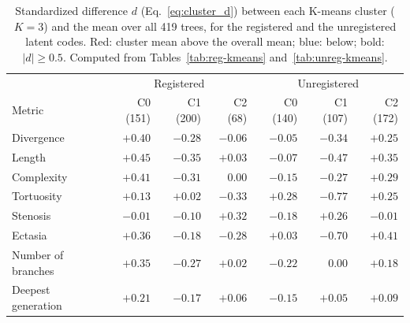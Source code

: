\begin{table}[htbp]                      %
  \centering
  \clustertablesetup
  \small
  \caption{Standardized difference $d$ (Eq.~\eqref{eq:cluster_d}) between each K-means cluster
           ($K=3$) and the mean over all 419 trees, for the registered and the unregistered latent
           codes. Red: cluster mean above the overall mean; blue: below; bold: $|d| \ge 0.5$.
           Computed from Tables~\ref{tab:reg-kmeans} and~\ref{tab:unreg-kmeans}.}
  \label{tab:clust_d}
  \begin{tabular}{lrrr|rrr}
    \toprule
    & \multicolumn{3}{c|}{Registered} & \multicolumn{3}{c}{Unregistered} \\
    Metric & C0 (151) & C1 (200) & C2 (68) & C0 (140) & C1 (107) & C2 (172) \\
    \midrule
    Divergence & \cellcolor{hiRed!16}$+0.40$ & \cellcolor{loBlue!11}$-0.28$ & \cellcolor{loBlue!2}$-0.06$ & \cellcolor{loBlue!2}$-0.05$ & \cellcolor{loBlue!14}$-0.34$ & \cellcolor{hiRed!10}$+0.25$ \\
    Length & \cellcolor{hiRed!18}$+0.45$ & \cellcolor{loBlue!14}$-0.35$ & \cellcolor{hiRed!1}$+0.03$ & \cellcolor{loBlue!3}$-0.07$ & \cellcolor{loBlue!19}$-0.47$ & \cellcolor{hiRed!14}$+0.35$ \\
    Complexity & \cellcolor{hiRed!16}$+0.41$ & \cellcolor{loBlue!12}$-0.31$ & $0.00$ & \cellcolor{loBlue!6}$-0.15$ & \cellcolor{loBlue!11}$-0.27$ & \cellcolor{hiRed!12}$+0.29$ \\
    Tortuosity & \cellcolor{hiRed!5}$+0.13$ & \cellcolor{hiRed!1}$+0.02$ & \cellcolor{loBlue!13}$-0.33$ & \cellcolor{hiRed!11}$+0.28$ & \cellcolor{loBlue!31}\textbf{$-0.77$} & \cellcolor{hiRed!10}$+0.25$ \\
    Stenosis & $-0.01$ & \cellcolor{loBlue!4}$-0.10$ & \cellcolor{hiRed!13}$+0.32$ & \cellcolor{loBlue!7}$-0.18$ & \cellcolor{hiRed!10}$+0.26$ & \cellcolor{loBlue!1}$-0.01$ \\
    Ectasia & \cellcolor{hiRed!14}$+0.36$ & \cellcolor{loBlue!7}$-0.18$ & \cellcolor{loBlue!11}$-0.28$ & \cellcolor{hiRed!1}$+0.03$ & \cellcolor{loBlue!28}\textbf{$-0.70$} & \cellcolor{hiRed!17}$+0.41$ \\
    Number of branches & \cellcolor{hiRed!14}$+0.35$ & \cellcolor{loBlue!11}$-0.27$ & \cellcolor{hiRed!1}$+0.02$ & \cellcolor{loBlue!9}$-0.22$ & $0.00$ & \cellcolor{hiRed!7}$+0.18$ \\
    Deepest generation & \cellcolor{hiRed!8}$+0.21$ & \cellcolor{loBlue!7}$-0.17$ & \cellcolor{hiRed!2}$+0.06$ & \cellcolor{loBlue!6}$-0.15$ & \cellcolor{hiRed!2}$+0.05$ & \cellcolor{hiRed!4}$+0.09$ \\
    \bottomrule
  \end{tabular}
\end{table}

